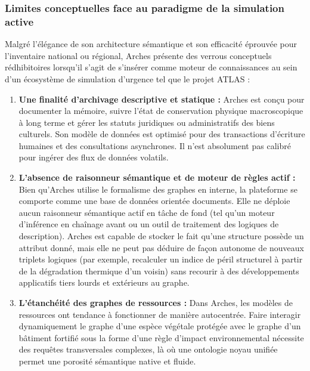 \documentclass{article}
\begin{document}
\subsubsection{Limites conceptuelles face au paradigme de la simulation active}

Malgré l'élégance de son architecture sémantique et son efficacité éprouvée pour l'inventaire national ou régional, Arches présente des verrous conceptuels rédhibitoires lorsqu'il s'agit de s'insérer comme moteur de connaissances au sein d'un écosystème de simulation d'urgence tel que le projet ATLAS :

\begin{enumerate}
    \item \textbf{Une finalité d'archivage descriptive et statique :} Arches est conçu pour documenter la mémoire, suivre l'état de conservation physique macroscopique à long terme et gérer les statuts juridiques ou administratifs des biens culturels. Son modèle de données est optimisé pour des transactions d'écriture humaines et des consultations asynchrones. Il n'est absolument pas calibré pour ingérer des flux de données volatils.
    \item \textbf{L'absence de raisonneur sémantique et de moteur de règles actif :} Bien qu'Arches utilise le formalisme des graphes en interne, la plateforme se comporte comme une base de données orientée documents. Elle ne déploie aucun raisonneur sémantique actif en tâche de fond (tel qu'un moteur d'inférence en chaînage avant ou un outil de traitement des logiques de description). Arches est capable de stocker le fait qu'une structure possède un attribut donné, mais elle ne peut pas déduire de façon autonome de nouveaux triplets logiques (par exemple, recalculer un indice de péril structurel à partir de la dégradation thermique d'un voisin) sans recourir à des développements applicatifs tiers lourds et extérieurs au graphe.
    \item \textbf{L'étanchéité des graphes de ressources :} Dans Arches, les modèles de ressources ont tendance à fonctionner de manière autocentrée. Faire interagir dynamiquement le graphe d'une espèce végétale protégée avec le graphe d'un bâtiment fortifié sous la forme d'une règle d'impact environnemental nécessite des requêtes transversales complexes, là où une ontologie noyau unifiée permet une porosité sémantique native et fluide.
\end{enumerate}
\end{document}
